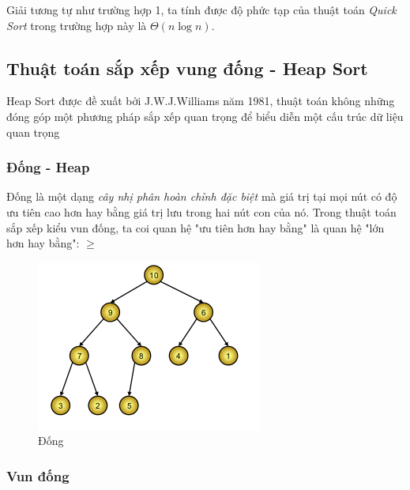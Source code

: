 \documentclass[a4paper,12pt]{report}
\begin{document}
\begin{itemize}
Giải tương tự như trường hợp 1, ta tính được độ phức tạp của thuật toán \emph{Quick Sort} trong trường hợp này là $\Theta(n \log n)$.
\end{itemize}


\subsection{Thuật toán sắp xếp vung đống - Heap Sort}

Heap Sort được đề xuất bởi J.W.J.Williams năm 1981, thuật toán không những đóng góp một phương pháp sắp xếp quan trọng để biểu diễn một cấu trúc dữ liệu quan trọng 

\subsubsection{Đống - Heap}
Đống là một dạng \emph{cây nhị phân hoàn chỉnh đặc biệt} mà giá trị tại mọi nút có độ ưu tiên cao hơn hay bằng giá trị lưu trong hai nút con của nó. Trong thuật toán sắp xếp kiểu vun đống, ta coi quan hệ "ưu tiên hơn hay bằng" là quan hệ "lớn hơn hay bằng": $ \ge $
\begin{figure}[htb]
\centering
\includegraphics[scale=0.6]{img/heaptree.png}
\caption{Đống}
\label{HeapTree}
\end{figure}

\subsubsection{Vun đống}
\end{document}
